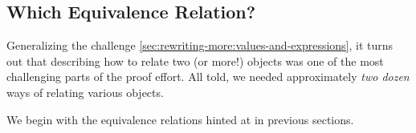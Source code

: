 \subsection{Which Equivalence Relation?}\label{sec:rewriting-more:which-equivalence}
Generalizing the challenge \autoref{sec:rewriting-more:values-and-expressions}, it turns out that describing how to relate two (or more!) objects was one of the most challenging parts of the proof effort.
All told, we needed approximately \emph{two dozen} ways of relating various objects.
%
%

We begin with the equivalence relations hinted at in previous sections.

